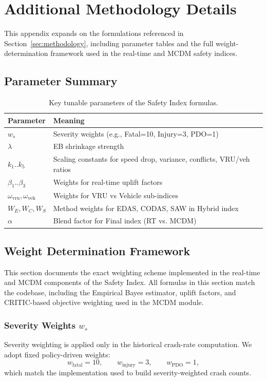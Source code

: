 \documentclass[conference]{IEEEtran}
\begin{document}
\section{Additional Methodology Details}
\label{appendix:methodology}

This appendix expands on the formulations referenced in Section~\ref{sec:methodology},
including parameter tables and the full weight-determination framework used in the
real-time and MCDM safety indices.

\subsection{Parameter Summary}
\begin{table}[ht]
\centering
\begin{tabularx}{\columnwidth}{lX}
\toprule
Parameter & Meaning \\
\midrule
$w_s$ & Severity weights (e.g., Fatal=10, Injury=3, PDO=1) \\
$\lambda$ & EB shrinkage strength \\
$k_1..k_5$ & Scaling constants for speed drop, variance, conflicts, VRU/veh ratios \\
$\beta_1..\beta_3$ & Weights for real-time uplift factors \\
$\omega_{\text{vru}},\omega_{\text{veh}}$ & Weights for VRU vs Vehicle sub-indices \\
$W_E,W_C,W_S$ & Method weights for EDAS, CODAS, SAW in Hybrid index \\
$\alpha$ & Blend factor for Final index (RT vs. MCDM) \\
\bottomrule
\end{tabularx}
\caption{Key tunable parameters of the Safety Index formulas.}
\end{table}

\subsection{Weight Determination Framework}
This section documents the exact weighting scheme implemented in the real-time 
and MCDM components of the Safety Index. All formulas in this section match the 
codebase, including the Empirical Bayes estimator, uplift factors, and CRITIC-based 
objective weighting used in the MCDM module.

\subsubsection{Severity Weights $w_s$}
Severity weighting is applied only in the historical crash-rate computation.  
We adopt fixed policy-driven weights:
\[
w_{\text{fatal}}=10,\qquad 
w_{\text{injury}}=3,\qquad
w_{\text{PDO}}=1,
\]
which match the implementation used to build severity-weighted crash counts.
\end{document}
